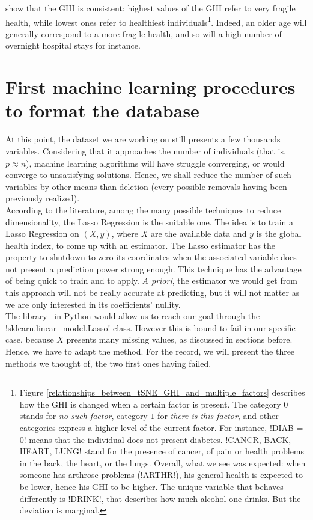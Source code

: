 \documentclass[]{article}
\begin{document}
show that the GHI is consistent: highest values of the GHI refer to very fragile health, while lowest ones refer to healthiest individuals\footnote{Figure \ref{relationships_between_tSNE_GHI_and_multiple_factors} describes how the GHI is changed when a certain factor is present. The category $0$ stands for \textit{no such factor}, category $1$ for \textit{there is this factor}, and other categories express a higher level of the current factor. For instance, \pyth!DIAB = 0! means that the individual does not present diabetes. \pyth!CANCR, BACK, HEART, LUNG! stand for the presence of cancer, of pain or health problems in the back, the heart, or the lungs. Overall, what we see was expected: when someone has arthrose problems (\pyth!ARTHR!), his general health is expected to be lower, hence his GHI to be higher. The unique variable that behaves differently is \pyth!DRINK!, that describes how much alcohol one drinks. But the deviation is marginal.}. Indeed, an older age will generally correspond to a more fragile health, and so will a high number of overnight hospital stays for instance.

\section{First machine learning procedures to format the database}
At this point, the dataset we are working on still presents a few thousands variables. Considering that it approaches the number of individuals (that is, $p \approx n$), machine learning algorithms will have struggle converging, or would converge to unsatisfying solutions. Hence, we shall reduce the number of such variables by other means than deletion (every possible removals having been previously realized).\\
According to the literature, among the many possible techniques to reduce dimensionality, the Lasso Regression is the suitable one. The idea is to train a Lasso Regression on $(X, y)$, where $X$ are the available data and $y$ is the global health index, to come up with an estimator. The Lasso estimator has the property to shutdown to zero its coordinates when the associated variable does not present a prediction power strong enough. This technique has the advantage of being quick to train and to apply. \textit{A priori}, the estimator we would get from this approach will not be really accurate at predicting, but it will not matter as we are only interested in its coefficients' nullity.\\
The library \sklearn\, in Python would allow us to reach our goal through the \pyth!sklearn.linear_model.Lasso! class. However this is bound to fail in our specific case, because $X$ presents many missing values, as discussed in sections before. Hence, we have to adapt the method. For the record, we will present the three methods we thought of, the two first ones having failed.
\end{document}
